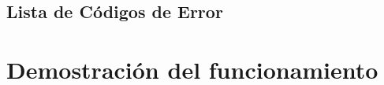 \documentclass{article}
\begin{document}
\subsection*{Lista de Códigos de Error}








\section{Demostración del funcionamiento}

\newpage

\newpage
\end{document}
